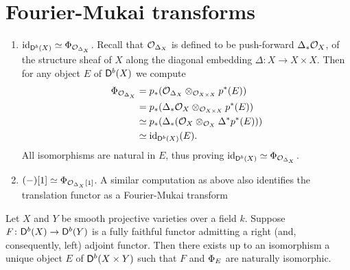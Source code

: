 \section{Fourier-Mukai transforms}

\begin{example}
    \label{Identifying fm transforms}
\begin{enumerate}[label = (\roman*)]
    \item{
    $\operatorname{id}_{\mathsf{D}^b(X)} \simeq \Phi_{\mathcal{O}_{\Delta_X}}$. Recall that $\mathcal{O}_{\Delta_X}$ is defined to be push-forward $\Delta_*\mathcal{O}_{X}$, of the structure sheaf of $X$ along the diagonal embedding $\Delta \colon X \to X \times X$. Then for any object $E$ of $\mathsf{D}^b(X)$ we compute 
    \begin{align*}
        \Phi_{\mathcal{O}_{\Delta_X}} &= p_*(\mathcal{O}_{\Delta_X} \otimes_{\mathcal{O}_{X \times X}} p^*(E)) \\
        &= p_*(\Delta_*\mathcal{O}_{X} \otimes_{\mathcal{O}_{X \times X}} p^*(E)) \\
        &\simeq p_*(\Delta_*(\mathcal{O}_{X} \otimes_{\mathcal{O}_{X}} \Delta^*p^*(E))) \\
        &\simeq \operatorname{id}_{\mathsf{D}^b(X)}(E).
    \end{align*}
    All isomorphisms are natural in $E$, thus proving $\operatorname{id}_{\mathsf{D}^b(X)} \simeq \Phi_{\mathcal{O}_{\Delta_X}}$.
    }
    \item{$(-)[1] \simeq \Phi_{\mathcal{O}_{\Delta_X}[1]}$. A similar computation as above also identifies the translation functor as a Fourier-Mukai transform}
\end{enumerate}
\end{example}

\begin{theorem}
    \label{Orlov's theorem}
    Let $X$ and $Y$ be smooth projective varieties over a field $k$. Suppose $F \colon \mathsf{D}^b(X) \to \mathsf{D}^b(Y)$ is a fully faithful functor admitting a right (and, consequently, left) adjoint functor. Then there exists up to an isomorphism a unique object $E$ of $\mathsf{D}^b(X \times Y)$ such that $F$ and $\Phi_{E}$ are naturally isomorphic.
\end{theorem}

